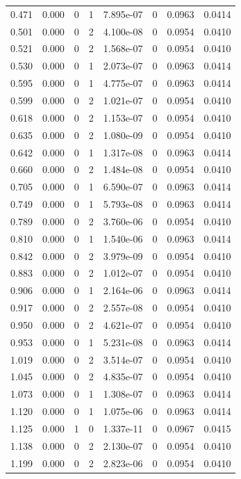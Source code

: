 \documentclass[preview]{standalone}
\begin{document}
{{\begin{tabular}{L{1.2cm}C{1.2cm} C{0.3cm}C{0.5cm} C{1.4cm}C{1.4cm} C{1.4cm}C{1.4cm}}
  0.471  &  0.000  & 0     &  1 &  7.895e-07  & 0  & 0.0963 &  0.0414   \\ 
  0.501  &  0.000  & 0     &  2 &  4.100e-08  & 0  & 0.0954 &  0.0410   \\ 
  0.521  &  0.000  & 0     &  2 &  1.568e-07  & 0  & 0.0954 &  0.0410   \\ 
  0.530  &  0.000  & 0     &  1 &  2.073e-07  & 0  & 0.0963 &  0.0414   \\ 
  0.595  &  0.000  & 0     &  1 &  4.775e-07  & 0  & 0.0963 &  0.0414   \\ 
  0.599  &  0.000  & 0     &  2 &  1.021e-07  & 0  & 0.0954 &  0.0410   \\ 
  0.618  &  0.000  & 0     &  2 &  1.153e-07  & 0  & 0.0954 &  0.0410   \\ 
  0.635  &  0.000  & 0     &  2 &  1.080e-09  & 0  & 0.0954 &  0.0410   \\ 
  0.642  &  0.000  & 0     &  1 &  1.317e-08  & 0  & 0.0963 &  0.0414   \\ 
  0.660  &  0.000  & 0     &  2 &  1.484e-08  & 0  & 0.0954 &  0.0410   \\ 
  0.705  &  0.000  & 0     &  1 &  6.590e-07  & 0  & 0.0963 &  0.0414   \\ 
  0.749  &  0.000  & 0     &  1 &  5.793e-08  & 0  & 0.0963 &  0.0414   \\ 
  0.789  &  0.000  & 0     &  2 &  3.760e-06  & 0  & 0.0954 &  0.0410   \\ 
  0.810  &  0.000  & 0     &  1 &  1.540e-06  & 0  & 0.0963 &  0.0414   \\ 
  0.842  &  0.000  & 0     &  2 &  3.979e-09  & 0  & 0.0954 &  0.0410   \\ 
  0.883  &  0.000  & 0     &  2 &  1.012e-07  & 0  & 0.0954 &  0.0410   \\ 
  0.906  &  0.000  & 0     &  1 &  2.164e-06  & 0  & 0.0963 &  0.0414   \\ 
  0.917  &  0.000  & 0     &  2 &  2.557e-08  & 0  & 0.0954 &  0.0410   \\ 
  0.950  &  0.000  & 0     &  2 &  4.621e-07  & 0  & 0.0954 &  0.0410   \\ 
  0.953  &  0.000  & 0     &  1 &  5.231e-08  & 0  & 0.0963 &  0.0414   \\ 
  1.019  &  0.000  & 0     &  2 &  3.514e-07  & 0  & 0.0954 &  0.0410   \\ 
  1.045  &  0.000  & 0     &  2 &  4.835e-07  & 0  & 0.0954 &  0.0410   \\ 
  1.073  &  0.000  & 0     &  1 &  1.308e-07  & 0  & 0.0963 &  0.0414   \\ 
  1.120  &  0.000  & 0     &  1 &  1.075e-06  & 0  & 0.0963 &  0.0414   \\ 
  1.125  &  0.000  & 1     &  0 &  1.337e-11  & 0  & 0.0967 &  0.0415   \\ 
  1.138  &  0.000  & 0     &  2 &  2.130e-07  & 0  & 0.0954 &  0.0410   \\ 
  1.199  &  0.000  & 0     &  2 &  2.823e-06  & 0  & 0.0954 &  0.0410   \\ 
\hline 
\end{tabular} 

}}
\end{document}
